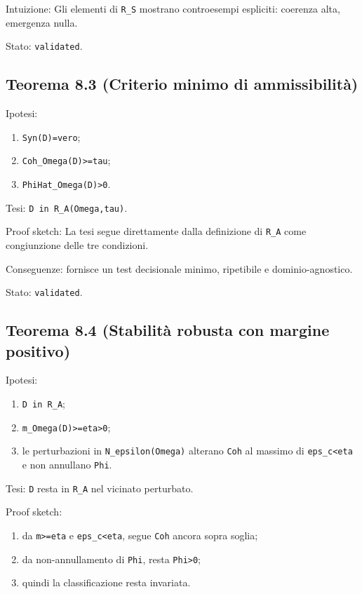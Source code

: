 Intuizione:
Gli elementi di \texttt{R\_S} mostrano controesempi espliciti: coerenza alta, emergenza nulla.

Stato: \texttt{validated}.

\subsection{Teorema 8.3 (Criterio minimo di ammissibilità)}

Ipotesi:

\begin{enumerate}
\def\labelenumi{\arabic{enumi}.}
\tightlist
\item
  \texttt{Syn(D)=vero};
\item
  \texttt{Coh\_Omega(D)\textgreater{}=tau};
\item
  \texttt{PhiHat\_Omega(D)\textgreater{}0}.
\end{enumerate}

Tesi:
\texttt{D\ in\ R\_A(Omega,tau)}.

Proof sketch:
La tesi segue direttamente dalla definizione di \texttt{R\_A} come congiunzione delle tre condizioni.

Conseguenze:
fornisce un test decisionale minimo, ripetibile e dominio-agnostico.

Stato: \texttt{validated}.

\subsection{Teorema 8.4 (Stabilità robusta con margine positivo)}

Ipotesi:

\begin{enumerate}
\def\labelenumi{\arabic{enumi}.}
\tightlist
\item
  \texttt{D\ in\ R\_A};
\item
  \texttt{m\_Omega(D)\textgreater{}=eta\textgreater{}0};
\item
  le perturbazioni in \texttt{N\_epsilon(Omega)} alterano \texttt{Coh} al massimo di \texttt{eps\_c\textless{}eta} e non annullano \texttt{Phi}.
\end{enumerate}

Tesi:
\texttt{D} resta in \texttt{R\_A} nel vicinato perturbato.

Proof sketch:

\begin{enumerate}
\def\labelenumi{\arabic{enumi}.}
\tightlist
\item
  da \texttt{m\textgreater{}=eta} e \texttt{eps\_c\textless{}eta}, segue \texttt{Coh} ancora sopra soglia;
\item
  da non-annullamento di \texttt{Phi}, resta \texttt{Phi\textgreater{}0};
\item
  quindi la classificazione resta invariata.
\end{enumerate}

